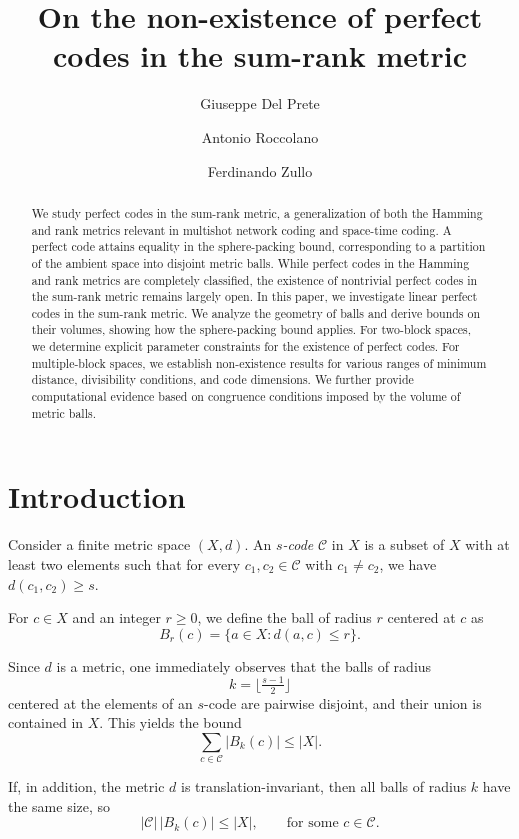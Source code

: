 \documentclass[11pt]{amsart}
\title{On the non-existence of perfect codes in the sum-rank metric}
\date{}
\author[G. Del Prete]{Giuseppe Del Prete}
\author[A. Roccolano]{Antonio Roccolano}
\author[F. Zullo]{Ferdinando Zullo}
\theoremstyle{definition}
\begin{document}
\begin{abstract}
We study perfect codes in the sum-rank metric, a generalization of both the Hamming and rank metrics relevant in multishot network coding and space-time coding. A perfect code attains equality in the sphere-packing bound, corresponding to a partition of the ambient space into disjoint metric balls. While perfect codes in the Hamming and rank metrics are completely classified, the existence of nontrivial perfect codes in the sum-rank metric remains largely open.
In this paper, we investigate linear perfect codes in the sum-rank metric. We analyze the geometry of balls and derive bounds on their volumes, showing how the sphere-packing bound applies. For two-block spaces, we determine explicit parameter constraints for the existence of perfect codes. For multiple-block spaces, we establish non-existence results for various ranges of minimum distance, divisibility conditions, and code dimensions. We further provide computational evidence based on congruence conditions imposed by the volume of metric balls.
\end{abstract}

\maketitle


\section{Introduction}

Consider a finite metric space $(X,d)$.  
An \emph{$s$-code} $\mathcal{C}$ in $X$ is a subset of $X$ with at least two elements such that for every $c_1, c_2 \in \mathcal{C}$ with $c_1 \ne c_2$, we have $d(c_1,c_2) \geq s$.

For $c \in X$ and an integer $r \geq 0$, we define the ball of radius $r$ centered at $c$ as
\[
B_r(c) = \{ a \in X : d(a,c) \leq r \}.
\]

Since $d$ is a metric, one immediately observes that the balls of radius  
\[
k = \Big\lfloor \tfrac{s-1}{2} \Big\rfloor
\]
centered at the elements of an $s$-code are pairwise disjoint, and their union is contained in $X$. This yields the bound
\[
\sum_{c \in \mathcal{C}} |B_k(c)| \leq |X|.
\]

If, in addition, the metric $d$ is translation-invariant, then all balls of radius $k$ have the same size, so
\begin{equation}\label{eq:spherepackinggen}
|\mathcal{C}| \, |B_k(c)| \leq |X|, \qquad \text{for some } c \in \mathcal{C}.
\end{equation}
\end{document}
